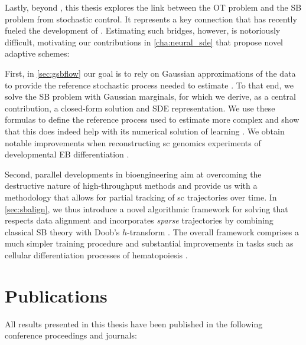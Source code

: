 Lastly, beyond , this thesis explores the link between the \acrlong{OT} problem and the \acrfull{SB} problem from stochastic control. It represents a key connection that has recently fueled the development of  \citep{de2021diffusion, chen2021stochastic, liu2022deep, bunne2022recovering}. Estimating such bridges, however, is notoriously difficult, motivating our contributions in \cref{cha:neural_sde} that propose novel adaptive schemes:

First, in \cref{sec:gsbflow} our goal is to rely on Gaussian approximations of the data to provide the reference stochastic process needed to estimate . To that end, we solve the \acrlong{SB} problem with Gaussian marginals, for which we derive, as a central contribution, a closed-form solution and \acrshort{SDE} representation. We use these formulas to define the reference process used to estimate more complex  and show that this does indeed help with its numerical solution of learning . We obtain notable improvements when reconstructing \acrlong{sc} genomics experiments of developmental \acrfull{EB} differentiation \citep{bunne2022recovering}.

Second, parallel developments in bioengineering aim at overcoming the destructive nature of high-throughput methods and provide us with a methodology that allows for partial tracking of \acrlong{sc} trajectories over time.
In \cref{sec:sbalign}, we thus introduce a novel algorithmic framework for solving  that respects data alignment and incorporates \emph{sparse} trajectories by combining classical \acrlong{SB} theory with Doob's 
$h$-transform \citep{somnath2023aligned}. The overall framework comprises a much simpler training procedure and substantial improvements in tasks such as cellular differentiation processes of hematopoiesis \citep{weinreb2020lineage}.



\newpage
\section{Publications}
All results presented in this thesis have been published in the following conference proceedings and journals:

